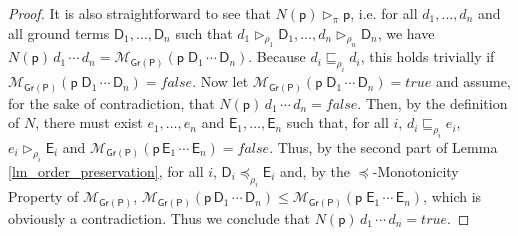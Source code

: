 \documentclass[submission,copyright]{eptcs}
\theoremstyle{definition}
\newcommand{\aleq}[1][]{\sqsubseteq_{#1}}
\newcommand{\ee}[1][I]{\rhd_{#1}}
\newcommand{\bezem}{\mathcal{M}_\mathsf{Gr(P)}}
\begin{document}
\begin{proof}
It is also straightforward to see that $N(\mathsf{p}) \ee[\pi] \mathsf{p}$, i.e.
for all $d_1, \ldots, d_n$ and all ground terms $\mathsf{D}_1, \ldots, \mathsf{D}_n$
such that $d_1 \ee[\rho_1] \mathsf{D}_1, \ldots, d_n \ee[\rho_n] \mathsf{D}_n$, we have
$N(\mathsf{p}) \,d_1\,\cdots\,d_n = \bezem(\mathsf{p} \; \mathsf{D}_1 \, \cdots \, \mathsf{D}_n)$. Because
$d_i \aleq[\rho_i] d_i$, this holds trivially if $\bezem(\mathsf{p} \; \mathsf{D}_1 \, \cdots \, \mathsf{D}_n) = \mathit{false}$.
Now let $\bezem(\mathsf{p} \; \mathsf{D}_1 \, \cdots \, \mathsf{D}_n) = true$ and assume, for the sake of
contradiction, that $N(\mathsf{p}) \,d_1\,\cdots\,d_n = \mathit{false}$. Then, by the definition
of $N$, there must exist $e_1, \ldots, e_n$ and $\mathsf{E}_1,\ldots,\mathsf{E}_n$ such that, for
all $i$, $d_i  \aleq[\rho_i] e_i$, $e_i \ee[\rho_i] \mathsf{E}_i$ and $\bezem(\mathsf{p}\, \mathsf{E}_1 \, \cdots \, \mathsf{E}_n)=\mathit{false}$.
Thus, by the second part of Lemma \ref{lm_order_preservation}, for all $i$, $\mathsf{D}_i \preceq_{\rho_i} \mathsf{E}_i$ and,
by the $\preceq$-Monotonicity Property of $\bezem$, $\bezem(\mathsf{p}\, \mathsf{D}_1 \, \cdots \, \mathsf{D}_n) \leq \bezem(\mathsf{p} \; \mathsf{E}_1 \, \cdots \, \mathsf{E}_n)$,
which is obviously a contradiction. Thus we conclude that $N(\mathsf{p}) \,d_1\,\cdots\,d_n=true$.


\end{proof}
\end{document}
